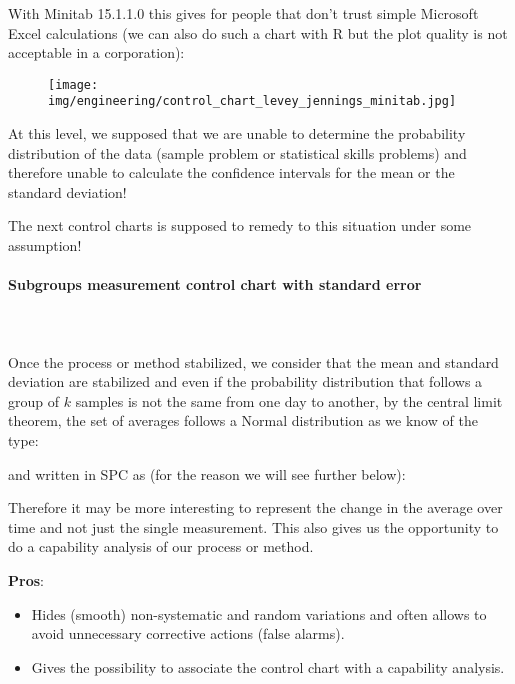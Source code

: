 	With Minitab 15.1.1.0 this gives for people that don't trust simple Microsoft Excel calculations (we can also do such a chart with R but the plot quality is not acceptable in a corporation):
	\begin{figure}[H]
		\centering
		\texttt{[image: img/engineering/control\_chart\_levey\_jennings\_minitab.jpg]}
	\end{figure}
	At this level, we supposed that we are unable to determine the probability distribution of the data (sample problem or statistical skills problems) and therefore unable to calculate the confidence intervals for the mean or the standard deviation!

	The next control charts is supposed to remedy to this situation under some assumption!
	
	\paragraph{Subgroups measurement control chart with standard error}\mbox{}\\\\
	Once the process or method stabilized, we consider that the mean and standard deviation are stabilized and even if the probability distribution that follows a group of $k$ samples is not the same from one day to another, by the central limit theorem, the set of averages follows a Normal distribution as we know of the type:
	
	and written in SPC as (for the reason we will see further below):
	
	Therefore it may be more interesting to represent the change in the average over time and not just the single measurement. This also gives us the opportunity to do a capability analysis of our process or method.
	
	\textbf{Pros}:
	\begin{itemize}
		\item Hides (smooth) non-systematic and random variations and often allows to avoid unnecessary corrective actions (false alarms).
		
		\item Gives the possibility to associate the control chart with a capability analysis.
	\end{itemize}

